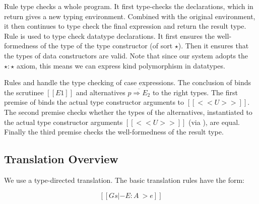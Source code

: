 
Rule  type checks a whole program. It first
type-checks the declarations, which in return gives a new typing
environment. Combined with the original environment, it then continues
to type check the final expression and return the result type. Rule
 is used to type check datatype declarations. It
first ensures the well-formedness of the type of the type constructor
(of sort $\star$). Then it ensures that the types of data constructors
are valid.  Note that since our system adopts the $\star : \star$
axiom, this means we can express kind polymorphism in datatypes.

Rules  and  handle the type
checking of case expressions. The conclusion of 
binds the scrutinee $[[E1]]$ and alternatives
$\overline{p \Rightarrow E_2}$ to the right types. The first premise
of  binds the actual type constructor arguments to
$[[<<U>>]]$. The second premise checks whether the types of the
alternatives, instantiated to the actual type constructor arguments
$[[<<U>>]]$ (via ), are equal. Finally the third
premise checks the well-formedness of the result type.


\subsection{Translation Overview}\label{sec:suf:typ}

We use a type-directed translation. The basic translation rules have the form:

\[
[[Gs  |- E : A ~> e]]
\]

